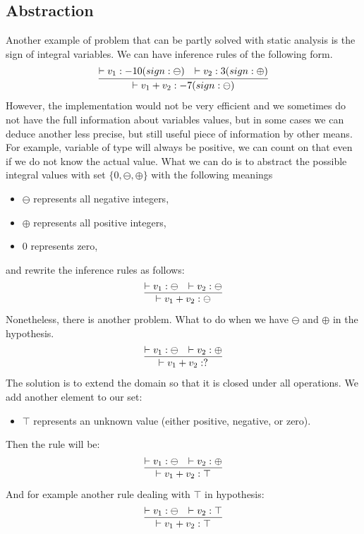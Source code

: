         \subsection{Abstraction}
            
        
        Another example of problem that can be partly solved with static analysis 
        is the sign of integral variables. We can have inference rules of the 
        following form.
        $$
        \infer{\vdash v_1+v_2 : -7 (sign: \ominus)}
        {\vdash v_1 : -10 (sign: \ominus) & \vdash v_2 : 3 (sign: \oplus)}
        $$
        However, the implementation would not be very efficient and we sometimes 
        do not have the full information about variables values, but in some cases 
        we can deduce another less precise, but still useful piece of information 
        by other means. For example, variable of 
        type  will always be positive, we can count on that 
        even if we do not know the actual value. What we 
        can do is to abstract the possible integral values with set 
        $\{0, \ominus, \oplus\}$ with the following meanings         
        \begin{itemize}
            \item $\ominus$ represents all negative integers,
            \item $\oplus$ represents all positive integers,
            \item $0$ represents zero,
        \end{itemize}                
        and rewrite the inference rules as follows:
        $$
        \infer{\vdash v_1+v_2 : \ominus}
        {\vdash v_1 : \ominus & \vdash v_2 : \ominus}
        $$
        Nonetheless, there is another problem. What to do when we have $\ominus$ 
        and $\oplus$ in the hypothesis.
        $$
        \infer{\vdash v_1+v_2 : ?}
        {\vdash v_1 : \ominus & \vdash v_2 : \oplus}
        $$
        The solution is to extend the domain so that it is closed under all operations. 
        We add another element to our set:
        \begin{itemize}
            \item $\top$ represents an unknown value (either positive, negative, or zero).
        \end{itemize}
        Then the rule will be:
        $$
        \infer{\vdash v_1+v_2 : \top}
        {\vdash v_1 : \ominus & \vdash v_2 : \oplus}
        $$
        And for example another rule dealing with $\top$ in hypothesis:
        $$
        \infer{\vdash v_1+v_2 : \top}
        {\vdash v_1 : \ominus & \vdash v_2 : \top}
        $$

